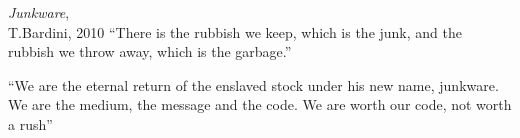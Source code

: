 \vspace*{\fill}
{\raggedleft
\thispagestyle{empty} %
\begin{chapquote}{ 
    \textit{Junkware},\\ 
    T.Bardini, 2010
}
  ``There is the rubbish we keep, which is the junk, and the rubbish we throw away, which is the garbage.''

  ``We are the eternal return of the enslaved stock under his new name, junkware. \newline
  We are the medium, the message and the code. \newline
  We are worth our code, not worth a rush''

\end{chapquote}
}

\vspace*{\fill}
